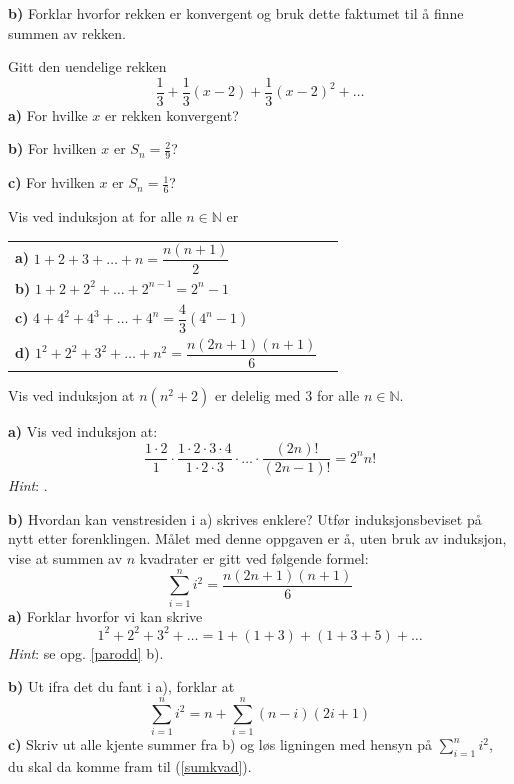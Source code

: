 \textbf{b)} Forklar hvorfor rekken er konvergent og bruk dette faktumet til å finne summen av rekken. 

Gitt den uendelige rekken
\[\frac{1}{3} +\frac{1}{3}(x-2)+ \frac{1}{3}(x-2)^2+\ldots\]
\textbf{a)} For hvilke $ x $ er rekken konvergent? \os

\textbf{b)} For hvilken $ x $ er $ S_n = \frac{2}{9} $?\os

\textbf{c)} For hvilken $ x $ er $ S_n= \frac{1}{6}$? \os

\nes
{}
Vis ved induksjon at for alle $ n\in \mathbb{N} $ er\\[10pt]
\begin{tabular}{@{}l l}	
	\textbf{a)} $ 1+2+3+\ldots+n = \dfrac{n(n+1)}{2} $ \\[10pt]
	\textbf{b)} $ 1+2 +2^2 +\ldots+ 2^{n-1}= 2^n-1$\\[10pt]
	\textbf{c)} $ 4+4^2+4^3+\ldots+4^n = \dfrac{4}{3}(4^n-1) $ \\[10pt]
	\textbf{d)} $ 1^2 + 2^2+3^2+ \ldots+ n^2 = \dfrac{n(2n+1)(n+1)}{6} $ 
\end{tabular} 

Vis ved induksjon at $ n(n^2+2) $ er delelig med 3 for alle $ n\in\mathbb{N} $.

\textbf{a)}
Vis ved induksjon at:
\[\frac{1\cdot2}{1}\cdot\frac{1\cdot2\cdot3\cdot4}{1\cdot2\cdot3}\cdot
\ldots\cdot\frac{(2n)!}{(2n-1)!}=2^n n! \]
\textsl{Hint}: .\os

\textbf{b)} Hvordan kan venstresiden i a) skrives enklere? Utfør induksjonsbeviset på nytt etter forenklingen.
\newpage
\ekspop 
Målet med denne oppgaven er å, uten bruk av induksjon, vise at summen av $ n $ kvadrater er gitt ved følgende formel:
\[ \sum\limits_{i=1}^n i^2 = \frac{n(2n+1)(n+1)}{6} \tag{I}\label{sumkvad}\]
\textbf{a)} Forklar hvorfor vi kan skrive
\[ 1^2 + 2^2 + 3^2+\ldots = 1 + (1+3) + (1+3+5)+ \ldots  \]
\textsl{Hint}: se opg. \ref{parodd} b).\os

\textbf{b)} Ut ifra det du fant i a), forklar at
\[ \sum\limits_{i=1}^n i^2 = n+\sum\limits_{i=1}^n (n-i)(2i+1)  \]
\textbf{c)} Skriv ut alle kjente summer fra b) og løs ligningen med hensyn på $ \sum\limits_{i=1}^n i^2 $, du skal da komme fram til (\ref{sumkvad}).

